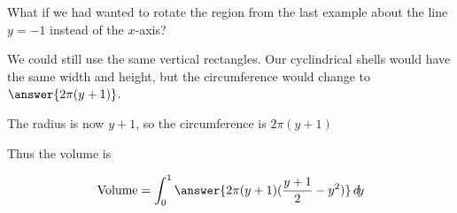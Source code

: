 \documentclass{ximera}
\begin{document}
\begin{example}
	What if we had wanted to rotate the region from the last example about the line $y = -1$ instead of the $x$-axis?

\begin{explanation}
We could still use the same vertical rectangles.  Our cyclindrical shells would have the same width and height, but the circumference would change to $\answer{2\pi(y+1)}$.

\begin{hint}
	The radius is now $y+1$, so the circumference is $2\pi(y+1)$
\end{hint}

Thus the volume is 

\[
\textrm{Volume} = \int_0^1 \answer{2\pi (y+1) (\frac{y+1}{2} - y^2)}\d y
\]
\end{explanation}


\end{example}
\end{document}
